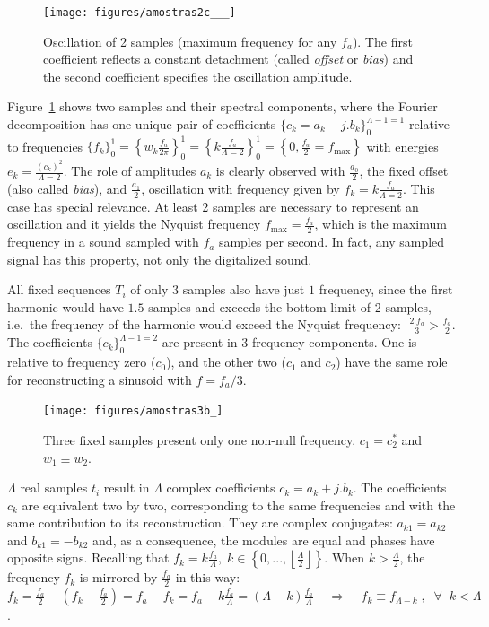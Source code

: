  \begin{figure}
     \centering
         \texttt{[image: figures/amostras2c\_\_\_]}
     \caption{Oscillation of 2 samples (maximum frequency for any $f_a$). The first coefficient reflects a constant detachment (called \emph{offset} or \emph{bias}) and the second coefficient specifies the oscillation amplitude.}
         \label{fig:amostras2}
 \end{figure}

Figure~\ref{fig:amostras2} shows two samples and their spectral components, where the Fourier decomposition has one unique pair of coefficients $\{c_k=a_k-j.b_k\}_0^{\Lambda-1=1}$ relative to frequencies $\{f_k\}_0^1=\left\{w_k\frac{f_a}{2\pi}\right\}_0^1=\left\{k\frac{f_a}{\Lambda=2}\right\}_0^1=\left\{0,\frac{f_a}{2}=f_{\text{max}}\right\}$
with energies $e_k=\frac{(c_k)^2}{\Lambda=2}$. The role of amplitudes $a_k$ is clearly observed with $\frac{a_0}{2}$, the fixed offset (also called \emph{bias}), and $\frac{a_1}{2}$, oscillation with frequency given by $f_k=k \frac{f_a}{\Lambda=2}$.
This case has special relevance. At least 2 samples are necessary to represent an oscillation and it yields the Nyquist frequency $f_{\text{max}}=\frac{f_a}{2}$, which is the maximum frequency in a sound sampled with $f_a$ samples per second. In fact, any sampled signal has this property, not only the digitalized sound.

All fixed sequences $T_i$ of only $3$ samples also have just $1$ frequency, since the first harmonic would have $1.5$ samples and exceeds the bottom limit of 2 samples, i.e.\ the frequency of the harmonic would exceed the Nyquist frequency:  $\; \frac{2. f_a}{3} > \frac{f_a}{2}$. 
The coefficients $\{c_k\}_0^{\Lambda-1=2}$ are present in 3 frequency components. One is relative to frequency zero ($c_0$), and the other two ($c_1$ and $c_2$) have the same role for reconstructing a sinusoid with $f=f_a/3$.

 \begin{figure}
     \centering
         \texttt{[image: figures/amostras3b\_]}
     \caption{Three fixed samples present only one non-null frequency. $c_1=c_2^*$ and $w_1 \equiv w_2$.}
         \label{fig:amostras3}
 \end{figure}

$\Lambda$ real samples $t_i$ result in $\Lambda$ complex coefficients $c_k=a_k+j.b_k$. The coefficients $c_k$ are equivalent two by two, corresponding to the same frequencies and with the same contribution to its reconstruction. They are complex conjugates: $a_{k1}=a_{k2}$ and $b_{k1}=-b_{k2}$ and, as a consequence, the modules are equal and phases have opposite signs. Recalling that $f_k = k\frac{f_a}{\Lambda}, \; k \in \left\{0, ..., \left \lfloor \frac{\Lambda}{2} \right \rfloor \right\} $. When $k > \frac{\Lambda}{2}$, the frequency $f_k$ is mirrored by $\frac{f_a}{2}$ in this way: $f_k=\frac{f_a}{2} - (f_k-\frac{f_a}{2})=f_a-f_k=f_a - k\frac{f_a}{\Lambda}=(\Lambda-k)\frac{f_a}{\Lambda} \;\;\;\; \Rightarrow \;\;\;\; f_k\equiv f_{\Lambda-k} \; ,\;\; \forall \;\; k<\Lambda$. 

